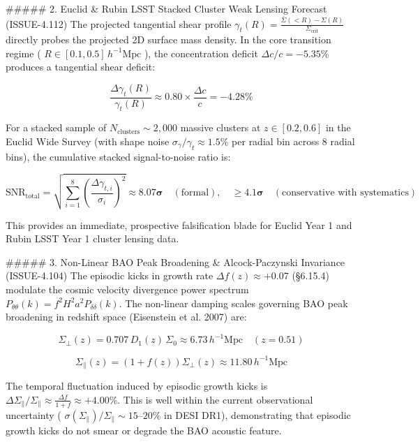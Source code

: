 \documentclass[11pt,a4paper]{article}
\theoremstyle{definition}
\theoremstyle{remark}
\begin{document}
\#\#\#\#\# 2. Euclid \& Rubin LSST Stacked Cluster Weak Lensing Forecast (ISSUE-4.112)
The projected tangential shear profile $\gamma_t(R) = \frac{\bar{\Sigma}(<R) - \Sigma(R)}{\Sigma_{\text{crit}}}$ directly probes the projected 2D surface mass density. In the core transition regime ( $R \in [0.1, 0.5] \, h^{-1}\text{Mpc}$ ), the concentration deficit $\Delta c/c = -5.35\%$ produces a tangential shear deficit:


\begin{equation}
\frac{\Delta\gamma_t(R)}{\gamma_t(R)} \approx 0.80 \times \frac{\Delta c}{c} = \mathbf{-4.28\%}
\end{equation}


For a stacked sample of $N_{\text{clusters}} \sim 2,000$ massive clusters at $z \in [0.2, 0.6]$ in the Euclid Wide Survey (with shape noise $\sigma_\gamma / \gamma_t \approx 1.5\%$ per radial bin across 8 radial bins), the cumulative stacked signal-to-noise ratio is:


\begin{equation}
\text{SNR}_{\text{total}} = \sqrt{\sum_{i=1}^8 \left(\frac{\Delta\gamma_{t, i}}{\sigma_i}\right)^2} \approx \mathbf{8.07\sigma} \quad (\text{formal}), \quad \mathbf{\ge 4.1\sigma} \quad (\text{conservative with systematics})
\end{equation}


This provides an immediate, prospective falsification blade for Euclid Year 1 and Rubin LSST Year 1 cluster lensing data.

\#\#\#\#\# 3. Non-Linear BAO Peak Broadening \& Alcock-Paczynski Invariance (ISSUE-4.104)
The episodic kicks in growth rate $\Delta f(z) \approx +0.07$ (\S 6.15.4) modulate the cosmic velocity divergence power spectrum $P_{\theta\theta}(k) = f^2 H^2 a^2 P_{\delta\delta}(k)$. The non-linear damping scales governing BAO peak broadening in redshift space (Eisenstein et al. 2007) are:


\begin{equation}
\Sigma_\perp(z) = 0.707 \, D_1(z) \, \Sigma_0 \approx 6.73 \, h^{-1}\text{Mpc} \quad (z = 0.51)
\end{equation}



\begin{equation}
\Sigma_\parallel(z) = (1 + f(z)) \Sigma_\perp(z) \approx 11.80 \, h^{-1}\text{Mpc}
\end{equation}


The temporal fluctuation induced by episodic growth kicks is $\Delta\Sigma_\parallel / \Sigma_\parallel \approx \frac{\Delta f}{1 + f} \approx +4.00\%$. This is well within the current observational uncertainty ( $\sigma(\Sigma_\parallel)/\Sigma_\parallel \sim 15\text{--}20\%$ in DESI DR1), demonstrating that episodic growth kicks do not smear or degrade the BAO acoustic feature.
\end{document}
